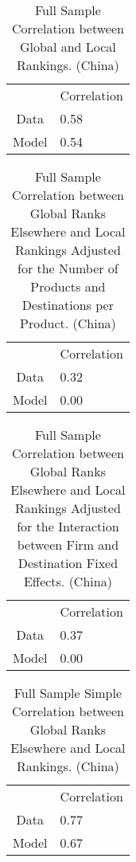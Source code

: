 \documentclass{article}
\begin{document}
\begin{table}[h]
\begin{threeparttable}
\captionsetup{width=0.9\textwidth} %
\caption{Full Sample Correlation between Global and Local Rankings. (China)  \label{FS_correlation}}
\begin{tabular}{cl} \hline\hline
             &    Correlation \\\cmidrule{1-2}%
 Data        &    0.58 \\
 Model       &    0.54 \\
\hline\hline
\end{tabular}
\end{threeparttable}
\end{table}
               
\begin{table}[h]
\begin{threeparttable}
\captionsetup{width=0.9\textwidth} %
\caption{Full Sample Correlation between Global Ranks Elsewhere  and Local Rankings Adjusted for the Number of Products and Destinations per Product. (China)  \label{FS_correlation}}
\begin{tabular}{cl} \hline\hline
             &    Correlation \\\cmidrule{1-2}%
 Data        &    0.32 \\
 Model       &    0.00 \\
\hline\hline
\end{tabular}
\end{threeparttable}
\end{table}
               
\begin{table}[h]
\begin{threeparttable}
\captionsetup{width=0.9\textwidth} 
\caption{Full Sample Correlation between Global Ranks Elsewhere  and Local Rankings Adjusted for the Interaction between Firm and Destination Fixed Effects. (China)  \label{FS_correlation}}
\begin{tabular}{cl} \hline\hline
             &    Correlation \\\cmidrule{1-2}%
 Data        &    0.37 \\
 Model       &    0.00 \\
\hline\hline
\end{tabular}
\end{threeparttable}
\end{table}
               
\begin{table}[h]
\begin{threeparttable}
\captionsetup{width=0.9\textwidth} 
\caption{Full Sample Simple Correlation between Global Ranks Elsewhere  and Local Rankings. (China)  \label{FS_correlation}}
\begin{tabular}{cl} \hline\hline
             &    Correlation \\\cmidrule{1-2}%
 Data        &    0.77 \\
 Model       &    0.67 \\
\hline\hline
\end{tabular}
\end{threeparttable}
\end{table}
\end{document}
